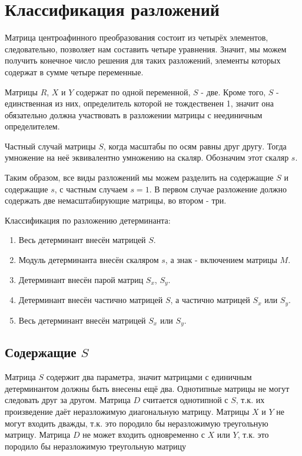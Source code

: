 \section{Классификация разложений}

Матрица центроафинного преобразования состоит из четырёх элементов, следовательно, позволяет нам составить четыре уравнения. Значит, мы можем получить конечное число решения для таких разложений, элементы которых содержат в сумме четыре переменные.

Матрицы $R$, $X$ и $Y$ содержат по одной переменной, $S$ - две. Кроме того, $S$ - единственная из них, определитель которой не тождественен 1, значит она обязательно должна участвовать в разложении матрицы с неединичным определителем.

Частный случай матрицы $S$, когда масштабы по осям равны друг другу. Тогда умножение на неё эквивалентно умножению на скаляр. Обозначим этот скаляр $s$.

Таким образом, все виды разложений мы можем разделить на содержащие $S$ и содержащие $s$, с частным случаем $s = 1$.
В первом случае разложение должно содержать две немасштабирующие матрицы, во втором - три.

Классификация по разложению детерминанта:
\begin{enumerate}
\item Весь детерминант внесён матрицей $S$.
\item Модуль детерминанта внесён скаляром $s$, а знак - включением матрицы $M$.
\item Детерминант внесён парой матриц $S_x$, $S_y$.
\item Детерминант внесён частично матрицей $S$, а частично матрицей $S_x$ или $S_y$.
\item Весь детерминант внесён матрицей $S_x$ или $S_y$.
\end{enumerate}


\subsection{Содержащие $S$}

Матрица $S$ содержит два параметра, значит матрицами с единичным детерминантом должны быть внесены ещё два.
Однотипные матрицы не могут следовать друг за другом.
Матрица $D$ считается однотипной с $S$, т.к. их произведение даёт неразложимую диагональную матрицу.
Матрицы $X$ и $Y$ не могут входить дважды, т.к. это породило бы неразложимую треугольную матрицу.
Матрица $D$ не может входить одновременно с $X$ или $Y$, т.к. это породило бы неразложимую треугольную матрицу

